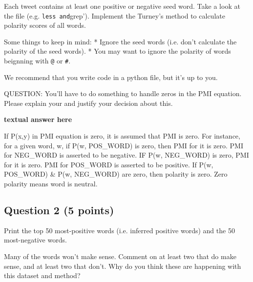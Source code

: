 \documentclass[11pt]{article}
\begin{document}
Each tweet contains at least one positive or negative seed word. Take a
look at the file (e.g. \texttt{less\textquotesingle{}\ and}grep').
Implement the Turney's method to calculate polarity scores of all words.

Some things to keep in mind: * Ignore the seed words (i.e. don't
calculate the polarity of the seed words). * You may want to ignore the
polarity of words beignning with \texttt{@} or \texttt{\#}.

We recommend that you write code in a python file, but it's up to you.

QUESTION: You'll have to do something to handle zeros in the PMI
equation. Please explain your and justify your decision about this.

    \textbf{textual answer here}

    If P(x,y) in PMI equation is zero, it is assumed that PMI is zero. For
instance, for a given word, w, if P(w, POS\_WORD) is zero, then PMI for
it is zero. PMI for NEG\_WORD is asserted to be negative. IF P(w,
NEG\_WORD) is zero, PMI for it is zero. PMI for POS\_WORD is asserted to
be positive. If P(w, POS\_WORD) \& P(w, NEG\_WORD) are zero, then
polarity is zero. Zero polarity means word is neutral.

    \subsection{Question 2 (5 points)}\label{question-2-5-points}

Print the top 50 most-positive words (i.e. inferred positive words) and
the 50 most-negative words.

Many of the words won't make sense. Comment on at least two that do make
sense, and at least two that don't. Why do you think these are happening
with this dataset and method?
\end{document}

